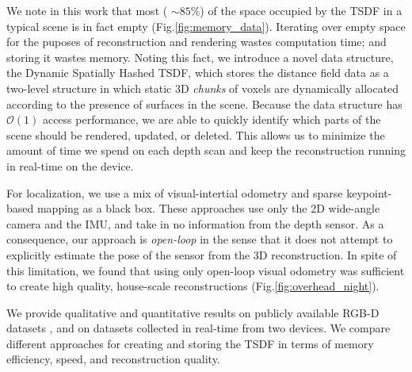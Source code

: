 \documentclass[10pt,twocolumn,letterpaper]{article}
\newcommand{\figref}[1]{Fig.\ref{#1}}
\begin{document}
We note in this work that most ( $\sim 85\%$) of the space occupied by
the TSDF in a typical scene is in fact empty (\figref{fig:memory_data}). Iterating over
empty space for the puposes of reconstruction and rendering wastes computation
time; and storing it wastes memory. Noting this fact, we introduce a novel
data structure, the Dynamic Spatially Hashed \cite{SpatialHashing} TSDF, which
stores the distance field data as a two-level structure in which static 3D \textit{chunks} of voxels
are dynamically allocated according to the presence of surfaces in the scene.
Because the data structure has $\mathcal{O}(1)$ access performance, we are able
to quickly identify which parts of the scene should be rendered, updated, or
deleted. This allows us to minimize the amount of time we spend on each depth
scan and keep the reconstruction running in real-time on the device.

For localization, we use a mix of  visual-intertial odometry \cite{VINS} and
sparse keypoint-based mapping \cite{FastSlam} as a black box. These approaches
use only the 2D wide-angle camera and the IMU, and take in no information from
the depth sensor. As a consequence, our approach is \textit{open-loop} in the
sense that it does not attempt to explicitly estimate the pose of the sensor
from the 3D reconstruction. In spite of this limitation, we found that
using only open-loop visual odometry was sufficient to create high quality,
house-scale reconstructions (\figref{fig:overhead_night}).

 We provide qualitative and  quantitative results on publicly available RGB-D
 datasets \cite{FREIBURG}, and on datasets collected in real-time from two
 devices. We compare different approaches for creating and storing the TSDF in
 terms of memory efficiency, speed, and reconstruction quality.
\end{document}
